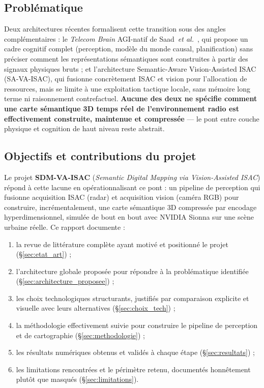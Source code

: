 \documentclass[12pt,a4paper,titlepage]{article}
\begin{document}
\subsection{Problématique}

Deux architectures récentes formalisent cette transition sous des angles complémentaires : le \textit{Telecom Brain} AGI-natif de Saad~\textit{et al.}~\cite{saad2025}, qui propose un cadre cognitif complet (perception, modèle du monde causal, planification) sans préciser comment les représentations sémantiques sont construites à partir des signaux physiques bruts ; et l'architecture Semantic-Aware Vision-Assisted ISAC (SA-VA-ISAC), qui fusionne concrètement ISAC et vision pour l'allocation de ressources, mais se limite à une exploitation tactique locale, sans mémoire long terme ni raisonnement contrefactuel. \textbf{Aucune des deux ne spécifie comment une carte sémantique 3D temps réel de l'environnement radio est effectivement construite, maintenue et compressée} --- le pont entre couche physique et cognition de haut niveau reste abstrait.

\subsection{Objectifs et contributions du projet}

Le projet \textbf{SDM-VA-ISAC} (\textit{Semantic Digital Mapping via Vision-Assisted ISAC}) répond à cette lacune en opérationnalisant ce pont : un pipeline de perception qui fusionne acquisition ISAC (radar) et acquisition vision (caméra RGB) pour construire, incrémentalement, une carte sémantique 3D compressée par encodage hyperdimensionnel, simulée de bout en bout avec NVIDIA Sionna sur une scène urbaine réelle. Ce rapport documente :
\begin{enumerate}[leftmargin=1.5em]
    \item la revue de littérature complète ayant motivé et positionné le projet (\S\ref{sec:etat_art}) ;
    \item l'architecture globale proposée pour répondre à la problématique identifiée (\S\ref{sec:architecture_proposee}) ;
    \item les choix technologiques structurants, justifiés par comparaison explicite et visuelle avec leurs alternatives (\S\ref{sec:choix_tech}) ;
    \item la méthodologie effectivement suivie pour construire le pipeline de perception et de cartographie (\S\ref{sec:methodologie}) ;
    \item les résultats numériques obtenus et validés à chaque étape (\S\ref{sec:resultats}) ;
    \item les limitations rencontrées et le périmètre retenu, documentés honnêtement plutôt que masqués (\S\ref{sec:limitations}).
\end{enumerate}
\end{document}
